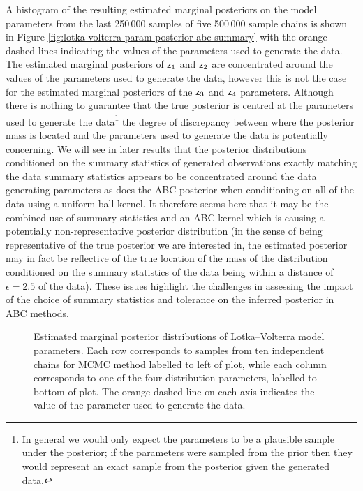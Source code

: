 A histogram of the resulting estimated marginal posteriors on the model parameters from the last 250\,000 samples of five 500\,000 sample chains is shown in Figure \ref{fig:lotka-volterra-param-posterior-abc-summary} with the orange dashed lines indicating the values of the parameters used to generate the data. The estimated marginal posteriors of $\mathsf{z}_1$ and $\mathsf{z}_2$ are concentrated around the values of the parameters used to generate the data, however this is not the case for the estimated marginal posteriors of the $\mathsf{z}_3$ and $\mathsf{z}_4$ parameters. Although there is nothing to guarantee that the true posterior is centred at the parameters used to generate the data\footnote{In general we would only expect the parameters to be a plausible sample under the posterior; if the parameters were sampled from the prior then they would represent an exact sample from the posterior given the generated data.} the degree of discrepancy between where the posterior mass is located and the parameters used to generate the data is potentially concerning. We will see in later results that the posterior distributions conditioned on the summary statistics of generated observations exactly matching the data summary statistics appears to be concentrated around the data generating parameters as does the \ac{ABC} posterior when conditioning on all of the data using a uniform ball kernel. It therefore seems here that it may be the combined use of summary statistics and an \ac{ABC} kernel which is causing a potentially non-representative posterior distribution (in the sense of being representative of the true posterior we are interested in, the estimated posterior may in fact be reflective of the true location of the mass of the distribution conditioned on the summary statistics of the data being within a distance of $\epsilon = 2.5$ of the data). These issues highlight the challenges in assessing the impact of the choice of summary statistics and tolerance on the inferred posterior in \ac{ABC} methods.

\begin{figure}
\centering
{}
\caption[Lotka--Volterra model posterior histograms (2).]{Estimated marginal posterior distributions of Lotka--Volterra model parameters. Each row corresponds to samples from ten independent chains for \ac{MCMC} method labelled to left of plot, while each column corresponds to one of the four distribution parameters, labelled to bottom of plot. The orange dashed line on each axis indicates the value of the parameter used to generate the data.}
\label{fig:lotka-volterra-param-posterior}
\end{figure}

